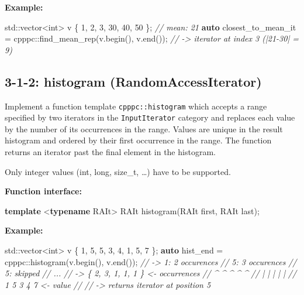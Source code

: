 \documentclass[]{article}
\newenvironment{Shaded}{}{}
\newcommand{\KeywordTok}[1]{\textcolor[rgb]{0.00,0.44,0.13}{\textbf{{#1}}}}
\newcommand{\DataTypeTok}[1]{\textcolor[rgb]{0.56,0.13,0.00}{{#1}}}
\newcommand{\DecValTok}[1]{\textcolor[rgb]{0.25,0.63,0.44}{{#1}}}
\newcommand{\CommentTok}[1]{\textcolor[rgb]{0.38,0.63,0.69}{\textit{{#1}}}}
\newcommand{\BuiltInTok}[1]{{#1}}
\newcommand{\NormalTok}[1]{{#1}}
\begin{document}
\textbf{Example:}

\begin{Shaded}
\begin{Highlighting}[]
\BuiltInTok{std::}\NormalTok{vector<}\DataTypeTok{int}\NormalTok{> v \{ }\DecValTok{1}\NormalTok{, }\DecValTok{2}\NormalTok{, }\DecValTok{3}\NormalTok{, }\DecValTok{30}\NormalTok{, }\DecValTok{40}\NormalTok{, }\DecValTok{50} \NormalTok{\}; }\CommentTok{// mean: 21}
\KeywordTok{auto} \NormalTok{closest_to_mean_it = cpppc::find_mean_rep(v.begin(), v.end());}
\CommentTok{// -> iterator at index 3 (|21-30| = 9)}
\end{Highlighting}
\end{Shaded}

\subsection{3-1-2: histogram
(RandomAccessIterator)}\label{histogram-randomaccessiterator}

Implement a function template \texttt{cpppc::histogram} which accepts a
range specified by two iterators in the \texttt{InputIterator} category
and replaces each value by the number of its occurrences in the range.
Values are unique in the result histogram and ordered by their first
occurrence in the range. The function returns an iterator past the final
element in the histogram.

Only integer values (int, long, size\_t, \ldots{}) have to be supported.

\textbf{Function interface:}

\begin{Shaded}
\begin{Highlighting}[]
\KeywordTok{template} \NormalTok{<}\KeywordTok{typename} \NormalTok{RAIt>}
\NormalTok{RAIt histogram(RAIt first, RAIt last);}
\end{Highlighting}
\end{Shaded}

\textbf{Example:}

\begin{Shaded}
\begin{Highlighting}[]
\BuiltInTok{std::}\NormalTok{vector<}\DataTypeTok{int}\NormalTok{> v \{ }\DecValTok{1}\NormalTok{, }\DecValTok{5}\NormalTok{, }\DecValTok{5}\NormalTok{, }\DecValTok{3}\NormalTok{, }\DecValTok{4}\NormalTok{, }\DecValTok{1}\NormalTok{, }\DecValTok{5}\NormalTok{, }\DecValTok{7} \NormalTok{\};}
\KeywordTok{auto} \NormalTok{hist_end = cpppc::histogram(v.begin(), v.end());}
\CommentTok{// -> 1: 2 occurences}
\CommentTok{//    5: 3 occurences}
\CommentTok{//    5: skipped}
\CommentTok{//    ...}
\CommentTok{// -> \{ 2, 3, 1, 1, 1 \}  <- occurrences}
\CommentTok{//      ^  ^  ^  ^  ^}
\CommentTok{//      |  |  |  |  |}
\CommentTok{//      1  5  3  4  7    <- value}
\CommentTok{//}
\CommentTok{// -> returns iterator at position 5}
\end{Highlighting}
\end{Shaded}
\end{document}
